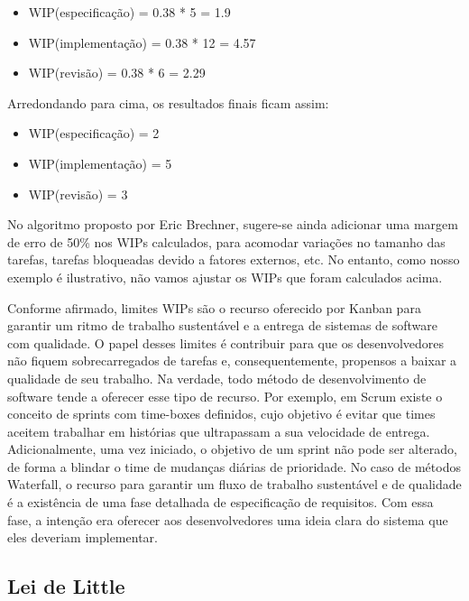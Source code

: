 \documentclass[
  11pt,
  twoside]{book}
\begin{document}
\begin{itemize}
\item
  WIP(especificação) = 0.38 * 5 = 1.9
\item
  WIP(implementação) = 0.38 * 12 = 4.57
\item
  WIP(revisão) = 0.38 * 6 = 2.29
\end{itemize}

Arredondando para cima, os resultados finais ficam assim:

\begin{itemize}
\item
  WIP(especificação) = 2
\item
  WIP(implementação) = 5
\item
  WIP(revisão) = 3
\end{itemize}

No algoritmo proposto por Eric Brechner, sugere-se ainda adicionar uma
margem de erro de 50\% nos WIPs calculados, para acomodar variações no
tamanho das tarefas, tarefas bloqueadas devido a fatores externos, etc.
No entanto, como nosso exemplo é ilustrativo, não vamos ajustar os WIPs
que foram calculados acima.

Conforme afirmado, limites WIPs são o recurso oferecido por Kanban para
garantir um ritmo de trabalho sustentável e a entrega de sistemas de
software com qualidade. O papel desses limites é contribuir para que os
desenvolvedores não fiquem sobrecarregados de tarefas e,
consequentemente, propensos a baixar a qualidade de seu trabalho. Na
verdade, todo método de desenvolvimento de software tende a oferecer
esse tipo de recurso. Por exemplo, em Scrum existe o conceito de sprints
com time-boxes definidos, cujo objetivo é evitar que times aceitem
trabalhar em histórias que ultrapassam a sua velocidade de entrega.
Adicionalmente, uma vez iniciado, o objetivo de um sprint não pode ser
alterado, de forma a blindar o time de mudanças diárias de prioridade.
No caso de métodos Waterfall, o recurso para garantir um fluxo de
trabalho sustentável e de qualidade é a existência de uma fase detalhada
de especificação de requisitos. Com essa fase, a intenção era oferecer
aos desenvolvedores uma ideia clara do sistema que eles deveriam
implementar.

\hypertarget{lei-de-little}{%
\subsection{Lei de Little}\label{lei-de-little}}

 
\end{document}
